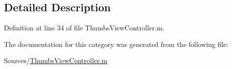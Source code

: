 \subsection{Detailed Description}


Definition at line 34 of file Thumbs\-View\-Controller.\-m.



The documentation for this category was generated from the following file\-:\begin{DoxyCompactItemize}
\item 
Sources/\hyperlink{_thumbs_view_controller_8m}{Thumbs\-View\-Controller.\-m}\end{DoxyCompactItemize}
